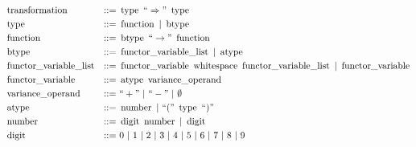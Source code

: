 \documentclass[../../Dissertation.tex]{subfiles}
\begin{document}
\begin{align*}
  &\transformterminal &::=&\ \typeterminal\ ``\Rightarrow"\ \typeterminal\\
  &\typeterminal &::=&\ \functionterminal\ |\ \btypeterminal\\
  &\functionterminal &::=&\ \btypeterminal\ ``\rightarrow"\ \functionterminal\\
  &\btypeterminal &::=&\ \variablelistterminal\ |\ \atypeterminal\\
  &\variablelistterminal &::=&\ \variableterminal\ \whitespaceterminal\ \variablelistterminal\ |\ \variableterminal\\
  &\variableterminal &::=&\ \atypeterminal\ \varianceterminal\\
  &\varianceterminal &::=&\ ``+"\ |\ ``-"\ |\ \emptyset\\
  &\atypeterminal &::=&\ \numberterminal\ |\ ``("\ \typeterminal\ ``)"\\
  &\numberterminal &::=&\ \digitterminal\ \numberterminal\ |\ \digitterminal\\
  &\digitterminal &::=&\ 0\ |\ 1\ |\ 2\ |\ 3\ |\ 4\ |\ 5\ |\ 6\ |\ 7\ |\ 8\ |\ 9
\end{align*}
\end{document}
